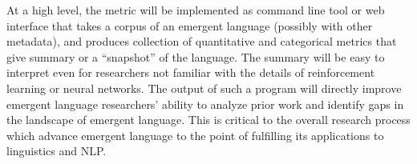 At a high level, the metric will be implemented as command line tool or web interface that takes a corpus of an emergent language (possibly with other metadata), and produces collection of quantitative and categorical metrics that give summary or a ``snapshot'' of the language.
The summary will be easy to interpret even for researchers not familiar with the details of reinforcement learning or neural networks.
The output of such a program will directly improve emergent language researchers' ability to analyze prior work and identify gaps in the landscape of emergent language.
This is critical to the overall research process which advance emergent language to the point of fulfilling its applications to linguistics and NLP.\sentspace{}






